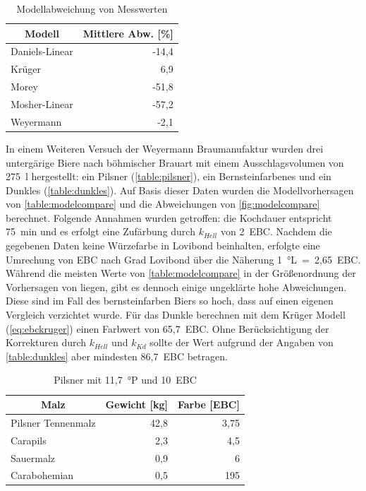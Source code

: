 \documentclass[a4paper,parskip=half]{scrartcl}
\newcommand{\khell}{k_{Hell}}
\newcommand{\kkd}{k_{Kd}}
\begin{document}
\begin{table}[H]
\centering
\begin{tabular}{lr}
\toprule
\multicolumn{1}{c}{\textbf{Modell}} & \multicolumn{1}{c}{\textbf{Mittlere Abw. [\%]}} \\
\midrule
Daniels-Linear & -14,4 \\
Krüger & 6,9 \\
Morey & -51,8 \\
Mosher-Linear & -57,2 \\
Weyermann & -2,1 \\
\bottomrule
\end{tabular}
\caption{Modellabweichung von Messwerten \parencite{KrausWeyermann2021b}}
\label{table:modelcompareall}
\end{table}

In einem Weiteren Versuch der Weyermann Braumanufaktur wurden drei untergärige Biere nach böhmischer Brauart mit einem Ausschlagsvolumen von 275~l hergestellt: ein Pilsner (\autoref{table:pilsner}), ein Bernsteinfarbenes und ein Dunkles (\autoref{table:dunkles}). Auf Basis dieser Daten wurden die Modellvorhersagen von \autoref{table:modelcompare} und die Abweichungen von \autoref{fig:modelcompare} berechnet. Folgende Annahmen wurden getroffen: die Kochdauer entspricht 75~min und es erfolgt eine Zufärbung durch $\khell$ von 2~EBC. Nachdem die gegebenen Daten keine Würzefarbe in Lovibond beinhalten, erfolgte eine Umrechung von EBC nach Grad Lovibond über die Näherung 1~°L~=~2,65~EBC. Während die meisten Werte von \autoref{table:modelcompare} in der Größenordnung der Vorhersagen von \textcite{KrausWeyermann2022} liegen, gibt es dennoch einige ungeklärte hohe Abweichungen. Diese sind im Fall des bernsteinfarben Biers so hoch, dass auf einen eigenen Vergleich verzichtet wurde. Für das Dunkle berechnen \textcite{KrausWeyermann2022} mit dem Krüger Modell (\autoref{eq:ebckruger}) einen Farbwert von 65,7~EBC. Ohne Berücksichtigung der Korrekturen durch $\khell$ und $\kkd$ sollte der Wert aufgrund der Angaben von \autoref{table:dunkles} aber mindesten 86,7~EBC betragen.

\begin{table}[H]
\centering
\begin{tabular}{lrr}
\toprule
\multicolumn{1}{c}{\textbf{Malz}} & \multicolumn{1}{c}{\textbf{Gewicht [kg]}} & \multicolumn{1}{c}{\textbf{Farbe [EBC]}} \\
\midrule
Pilsner Tennenmalz & 42,8 & 3,75 \\
Carapils & 2,3 & 4,5 \\
Sauermalz & 0,9 & 6 \\
Carabohemian & 0,5 & 195 \\
\bottomrule
\end{tabular}
\caption{Pilsner mit 11,7~°P und 10~EBC \parencite{KrausWeyermann2022}}
\label{table:pilsner}
\end{table}
\end{document}
